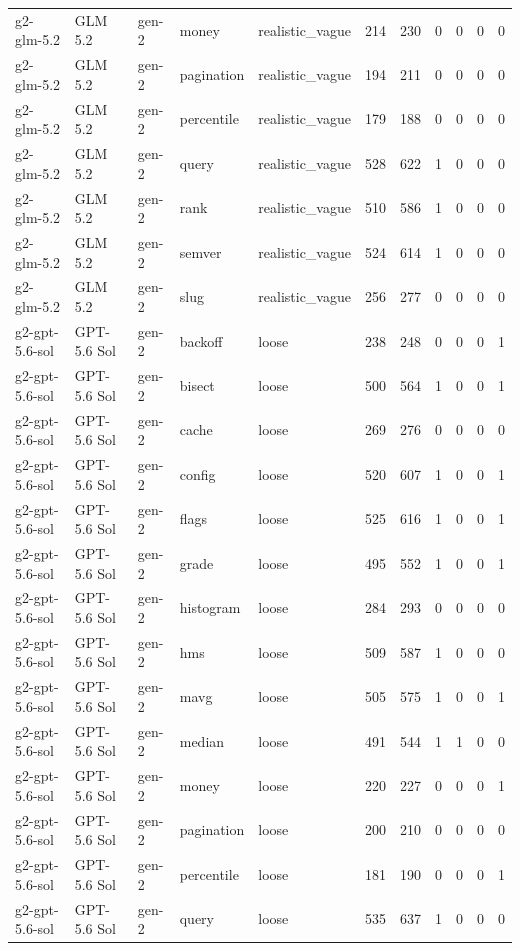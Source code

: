 \begin{tabular}{lllllllllll}
g2-glm-5.2 & GLM 5.2 & gen-2 & money & realistic\_vague & 214 & 230 & 0 & 0 & 0 & 0 \\
g2-glm-5.2 & GLM 5.2 & gen-2 & pagination & realistic\_vague & 194 & 211 & 0 & 0 & 0 & 0 \\
g2-glm-5.2 & GLM 5.2 & gen-2 & percentile & realistic\_vague & 179 & 188 & 0 & 0 & 0 & 0 \\
g2-glm-5.2 & GLM 5.2 & gen-2 & query & realistic\_vague & 528 & 622 & 1 & 0 & 0 & 0 \\
g2-glm-5.2 & GLM 5.2 & gen-2 & rank & realistic\_vague & 510 & 586 & 1 & 0 & 0 & 0 \\
g2-glm-5.2 & GLM 5.2 & gen-2 & semver & realistic\_vague & 524 & 614 & 1 & 0 & 0 & 0 \\
g2-glm-5.2 & GLM 5.2 & gen-2 & slug & realistic\_vague & 256 & 277 & 0 & 0 & 0 & 0 \\
g2-gpt-5.6-sol & GPT-5.6 Sol & gen-2 & backoff & loose & 238 & 248 & 0 & 0 & 0 & 1 \\
g2-gpt-5.6-sol & GPT-5.6 Sol & gen-2 & bisect & loose & 500 & 564 & 1 & 0 & 0 & 1 \\
g2-gpt-5.6-sol & GPT-5.6 Sol & gen-2 & cache & loose & 269 & 276 & 0 & 0 & 0 & 0 \\
g2-gpt-5.6-sol & GPT-5.6 Sol & gen-2 & config & loose & 520 & 607 & 1 & 0 & 0 & 1 \\
g2-gpt-5.6-sol & GPT-5.6 Sol & gen-2 & flags & loose & 525 & 616 & 1 & 0 & 0 & 1 \\
g2-gpt-5.6-sol & GPT-5.6 Sol & gen-2 & grade & loose & 495 & 552 & 1 & 0 & 0 & 1 \\
g2-gpt-5.6-sol & GPT-5.6 Sol & gen-2 & histogram & loose & 284 & 293 & 0 & 0 & 0 & 0 \\
g2-gpt-5.6-sol & GPT-5.6 Sol & gen-2 & hms & loose & 509 & 587 & 1 & 0 & 0 & 0 \\
g2-gpt-5.6-sol & GPT-5.6 Sol & gen-2 & mavg & loose & 505 & 575 & 1 & 0 & 0 & 1 \\
g2-gpt-5.6-sol & GPT-5.6 Sol & gen-2 & median & loose & 491 & 544 & 1 & 1 & 0 & 0 \\
g2-gpt-5.6-sol & GPT-5.6 Sol & gen-2 & money & loose & 220 & 227 & 0 & 0 & 0 & 1 \\
g2-gpt-5.6-sol & GPT-5.6 Sol & gen-2 & pagination & loose & 200 & 210 & 0 & 0 & 0 & 0 \\
g2-gpt-5.6-sol & GPT-5.6 Sol & gen-2 & percentile & loose & 181 & 190 & 0 & 0 & 0 & 1 \\
g2-gpt-5.6-sol & GPT-5.6 Sol & gen-2 & query & loose & 535 & 637 & 1 & 0 & 0 & 0 \\

\end{tabular}
